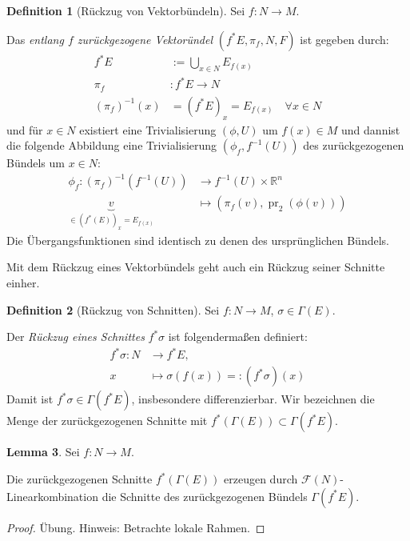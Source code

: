 \documentclass[a4paper]{scrreprt}
\numberwithin{equation}{chapter}
\DeclareMathOperator{\pr}{pr}
\newcommand{\R}{\mathbb{R}}
\newcommand{\sm}{\mathcal{F}}
\theoremstyle{definition}
\newtheorem{defn}{Definition}[section]
\newtheorem{lemma}[defn]{Lemma}
\begin{document}
		\begin{defn}[Rückzug von Vektorbündeln]
			Sei $f\colon N\rightarrow M$.
			
			Das \emph{entlang $f$ zurückgezogene Vektoründel} $(f^*E,\pi_f,N, F)$ ist gegeben durch:
			\begin{align*}
				f^*E&:=\bigcup _{x\in N} E_{f(x)}\\
				\pi_f&\colon f^*E\rightarrow N\\
				(\pi_f)^{-1}(x)&=(f^*E)_x=E_{f(x)}\quad\forall x\in N
			\end{align*}
			und für $x\in N$ existiert eine Trivialisierung $(\phi,U)$ um $f(x)\in M$ und dannist die folgende Abbildung eine Trivialisierung $(\phi_f,f^{-1}(U))$ des zurückgezogenen Bündels um $x\in N$:
			\begin{align*}
				\phi_f \colon (\pi_f)^{-1}(f^{-1}(U))&\rightarrow f^{-1}(U)\times\R^n\\
				\underbrace{v}_{\in (f^*(E))_x=E_{f(x)}}&\mapsto (\pi_f(v),\pr_2(\phi(v)))
			\end{align*}
			Die Übergangsfunktionen sind identisch zu denen des ursprünglichen Bündels.
		\end{defn}
		Mit dem Rückzug eines Vektorbündels geht auch ein Rückzug seiner Schnitte einher.
		\begin{defn}[Rückzug von Schnitten]
			Sei $f:N\rightarrow M$, $\sigma\in\Gamma(E)$.
			
			Der \emph{Rückzug eines Schnittes} $f^*\sigma$ ist folgendermaßen definiert:
			\begin{align*}
				f^*\sigma\colon N &\rightarrow f^*E,\\
				x &\mapsto \sigma(f(x))=: (f^*\sigma)(x)
			\end{align*}
			Damit ist $f^*\sigma\in\Gamma(f^*E)$, insbesondere differenzierbar. Wir bezeichnen die Menge der zurückgezogenen Schnitte mit $f^*(\Gamma(E))\subset\Gamma(f^*E)$.
		\end{defn}
		\begin{lemma}\label{lemma:Zurückziehen_von_Schnitten}
			Sei $f:N\rightarrow M$.
			
			Die zurückgezogenen Schnitte $f^*(\Gamma(E))$ erzeugen durch $\sm(N)$-Linearkombination die Schnitte des zurückgezogenen Bündels $\Gamma(f^*E)$.
			\begin{proof}
				Übung. Hinweis: Betrachte lokale Rahmen.
			\end{proof}
		\end{lemma}


\end{document}
